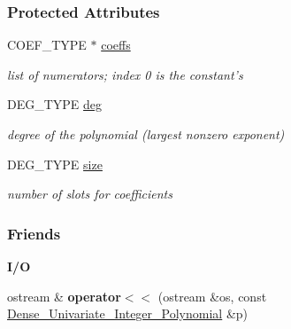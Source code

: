 \subsubsection*{Protected Attributes}
\begin{DoxyCompactItemize}
\item 
\mbox{\label{group__polygroup_ac980954e486906d80d08f4155254d186}} 
C\+O\+E\+F\+\_\+\+T\+Y\+PE $\ast$ \hyperlink{group__polygroup_ac980954e486906d80d08f4155254d186}{coeffs}
\begin{DoxyCompactList}\small\item\em list of numerators; index 0 is the constant's \end{DoxyCompactList}\item 
\mbox{\label{group__polygroup_a2dc3d8ec3b25f3a17417883c890fbdce}} 
D\+E\+G\+\_\+\+T\+Y\+PE \hyperlink{group__polygroup_a2dc3d8ec3b25f3a17417883c890fbdce}{deg}
\begin{DoxyCompactList}\small\item\em degree of the polynomial (largest nonzero exponent) \end{DoxyCompactList}\item 
\mbox{\label{group__polygroup_a7691962e41ebc91eb18c270f0d11845a}} 
D\+E\+G\+\_\+\+T\+Y\+PE \hyperlink{group__polygroup_a7691962e41ebc91eb18c270f0d11845a}{size}
\begin{DoxyCompactList}\small\item\em number of slots for coefficients \end{DoxyCompactList}\end{DoxyCompactItemize}
\subsubsection*{Friends}
\begin{Indent}\textbf{ I/O}\par
\begin{DoxyCompactItemize}
\item 
\mbox{\label{group__polygroup_a73b460b2b57fc554551b92dfc818d45d}} 
ostream \& {\bfseries operator$<$$<$} (ostream \&os, const \hyperlink{group__polygroup_class_dense___univariate___integer___polynomial}{Dense\+\_\+\+Univariate\+\_\+\+Integer\+\_\+\+Polynomial} \&p)
\end{DoxyCompactItemize}
\end{Indent}


